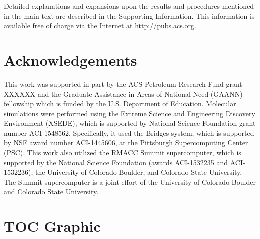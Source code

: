 \documentclass{article}
\begin{document}
  Detailed explanations and expansions upon the results and procedures mentioned in
  the main text are described in the Supporting Information. This information is
  available free of charge via the Internet at http://pubs.acs.org.

  \section*{Acknowledgements}

  This work was supported in part by the ACS Petroleum Research Fund grant XXXXXX 
  and the Graduate Assistance in Areas of National Need (GAANN)
  fellowship which is funded by the U.S. Department of Education.
  Molecular simulations were performed using the Extreme Science and
  Engineering Discovery Environment (XSEDE), which is supported by National
  Science Foundation grant number ACI-1548562. Specifically, it used the Bridges
  system, which is supported by NSF award number ACI-1445606, at the Pittsburgh
  Supercomputing Center (PSC). This work also utilized the RMACC Summit supercomputer,
  which is supported by the National Science Foundation (awards ACI-1532235 and
  ACI-1532236), the University of Colorado Boulder, and Colorado State
  University. The Summit supercomputer is a joint effort of the University of
  Colorado Boulder and Colorado State University.

  \clearpage

  
  

  \newpage

  \section*{TOC Graphic}
\end{document}
